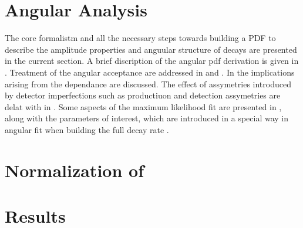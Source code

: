 \section{Angular Analysis}
\label{Angular_Analysis}
 
The core formalistm and all the necessary steps towards building a PDF to describe the amplitude properties and anguular structure of \BJpsiKst decays are presented in
the current section. A brief discription of the angular pdf derivation is given in .
Treatment of the angular acceptance are addressed in  and .
In  the implications arising from the \mkpi dependance are discussed.
The effect of assymetries introduced by detector imperfections such as productiuon and detection assymetries are delat with
in . Some aspects of the maximum likelihood fit are presented in ,
along with the \ACP parameters of interest, which are introduced in a special way in angular fit when building the full decay rate \pdf.



\section{Normalization of \BsJpsiKpi}
\label{Normalization}

\section{Results}
\label{Results}

